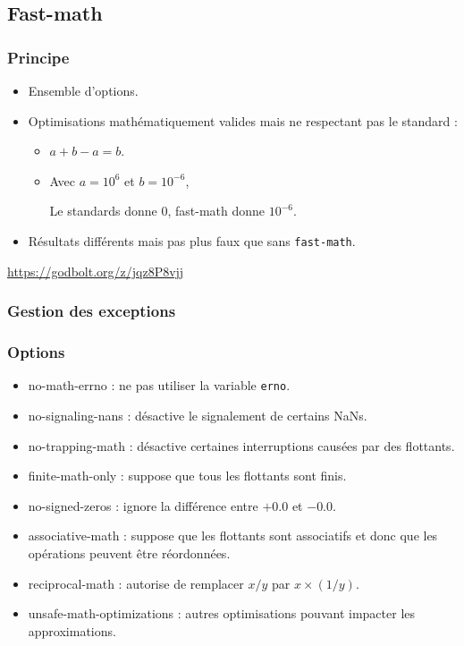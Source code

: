 \documentclass{beamer}
\begin{document}
\subsection{Fast-math}

\begin{frame}[fragile]
    \frametitle{Principe}

    \begin{itemize}
        \item Ensemble d'options.
        \item Optimisations mathématiquement valides mais ne respectant pas le standard :
              \begin{itemize}
                  \item $a+b-a = b$.
                  \item Avec $a = 10^6$ et $b = 10^{-6}$,

                        Le standards donne $0$, fast-math donne $10^{-6}$.
              \end{itemize}
        \item Résultats différents mais pas plus faux que sans \verb'fast-math'.
    \end{itemize}

    \url{https://godbolt.org/z/jqz8P8vjj}
\end{frame}

\subsubsection{Gestion des exceptions}

\begin{frame}[fragile]
    \frametitle{Options}

    \begin{itemize}
        \item no-math-errno : ne pas utiliser la variable \verb'erno'.
        \item no-signaling-nans : désactive le signalement de certains NaNs.
        \item no-trapping-math : désactive certaines interruptions causées par des flottants.
        \item finite-math-only : suppose que tous les flottants sont finis.
        \item no-signed-zeros : ignore la différence entre $+0.0$ et $-0.0$.
        \item associative-math : suppose que les flottants sont associatifs et donc que les opérations peuvent être réordonnées.
        \item reciprocal-math : autorise de remplacer $x/y$ par $x \times (1/y)$.
        \item unsafe-math-optimizations : autres optimisations pouvant impacter les approximations.
    \end{itemize}
\end{frame}
\end{document}
